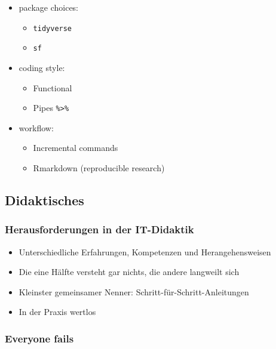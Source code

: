\documentclass[11pt,german,a4paper]{article}
\providecommand{\tightlist}{%
  \setlength{\itemsep}{0pt}\setlength{\parskip}{0pt}}
\begin{document}
\begin{itemize}
\tightlist
\item
  package choices:

  \begin{itemize}
  \tightlist
  \item
    \texttt{tidyverse}
  \item
    \texttt{sf}
  \end{itemize}
\item
  coding style:

  \begin{itemize}
  \tightlist
  \item
    Functional
  \item
    Pipes \texttt{\%\textgreater{}\%}
  \end{itemize}
\item
  workflow:

  \begin{itemize}
  \tightlist
  \item
    Incremental commands
  \item
    Rmarkdown (reproducible research)
  \end{itemize}
\end{itemize}

\hypertarget{didaktisches}{%
\subsection{Didaktisches}\label{didaktisches}}

\hypertarget{herausforderungen-in-der-it-didaktik}{%
\subsubsection{Herausforderungen in der IT-Didaktik}\label{herausforderungen-in-der-it-didaktik}}

\begin{itemize}
\tightlist
\item
  Unterschiedliche Erfahrungen, Kompetenzen und Herangehensweisen
\item
  Die eine Hälfte versteht gar nichts, die andere langweilt sich
\item
  Kleinster gemeinsamer Nenner: Schritt-für-Schritt-Anleitungen
\item
  In der Praxis wertlos
\end{itemize}

\hypertarget{everyone-fails}{%
\subsubsection{Everyone fails}\label{everyone-fails}}
\end{document}
